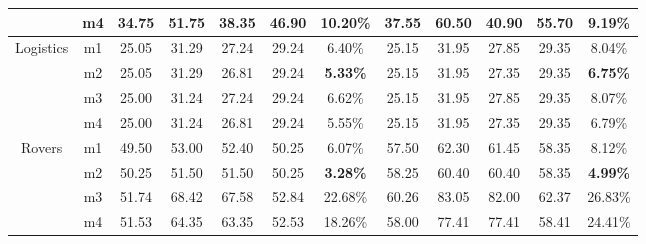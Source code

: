 \documentclass{article}
\theoremstyle{remark}
\begin{document}
\begin{table}[ht]
\begin{tabular}{|c|c|c|c|c|c|c||c|c|c|c|c|}
                                 & m4                          & 34.75        & 51.75        & 38.35             & 46.90             & 10.20\%          & 37.55        & 60.50        & 40.90             & 55.70             & 9.19\%          \\ \hline
\multirow{4}{*}{Logistics}       & m1                          & 25.05        & 31.29        & 27.24             & 29.24             & 6.40\%           & 25.15        & 31.95        & 27.85             & 29.35             & 8.04\%          \\ \cline{2-12} 
                                 & m2                          & 25.05        & 31.29        & 26.81             & 29.24             & \textbf{5.33\%}  & 25.15        & 31.95        & 27.35             & 29.35             & \textbf{6.75\%} \\ \cline{2-12} 
                                 & m3                          & 25.00        & 31.24        & 27.24             & 29.24             & 6.62\%           & 25.15        & 31.95        & 27.85             & 29.35             & 8.07\%          \\ \cline{2-12} 
                                 & m4                          & 25.00        & 31.24        & 26.81             & 29.24             & 5.55\%           & 25.15        & 31.95        & 27.35             & 29.35             & 6.79\%          \\ \hline
\multirow{4}{*}{Rovers}          & m1                          & 49.50        & 53.00        & 52.40             & 50.25             & 6.07\%           & 57.50        & 62.30        & 61.45             & 58.35             & 8.12\%          \\ \cline{2-12} 
                                 & m2                          & 50.25        & 51.50        & 51.50             & 50.25             & \textbf{3.28\%}  & 58.25        & 60.40        & 60.40             & 58.35             & \textbf{4.99\%} \\ \cline{2-12} 
                                 & m3                          & 51.74        & 68.42        & 67.58             & 52.84             & 22.68\%          & 60.26        & 83.05        & 82.00             & 62.37             & 26.83\%         \\ \cline{2-12} 
                                 & m4                          & 51.53        & 64.35        & 63.35             & 52.53             & 18.26\%          & 58.00        & 77.41        & 77.41             & 58.41             & 24.41\%         \\ \hline

\end{tabular}
\end{table}
\end{document}
